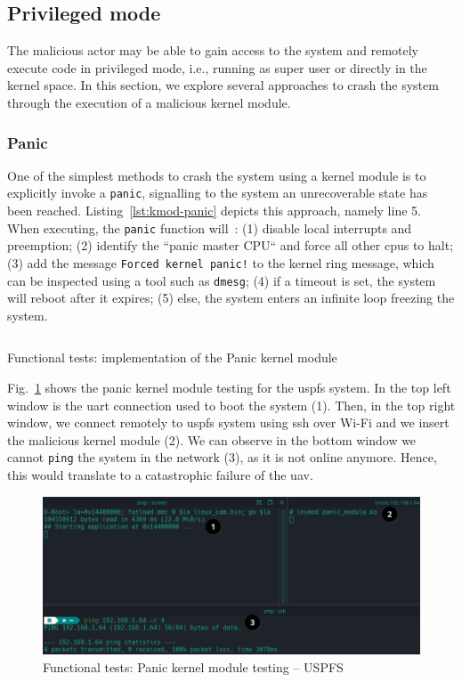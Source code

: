 \subsection{Privileged mode}
\label{sec:privileged-mode}
The malicious actor may be able to gain access to the system and remotely
execute code in privileged mode, i.e., running as super user or directly in the
kernel space. In this section, we explore several approaches to crash the system
through the execution of a malicious kernel module.

\subsubsection{Panic}
\label{sec:panic}
One of the simplest methods to crash the system using a kernel module is to
explicitly invoke a \lstinline{panic}, signalling to the system an unrecoverable
state has been reached. Listing~\ref{lst:kmod-panic} depicts this approach, namely
line 5. When executing, the \lstinline{panic} function will~\cite{panicLinux}: (1) disable local
interrupts and preemption; (2) identify the ``panic master CPU`` and force all
other \glspl{cpu} to halt; (3) add the message 
\lstinline{Forced kernel panic!} to the kernel ring message, which can be inspected using a tool
such as \lstinline{dmesg}; (4) if a timeout is set, the system will reboot after
it expires; (5)
else, the system enters an infinite loop freezing the system.

\begin{longlisting}
\centering
\inputminted[]{c}{./listing/kmod_panic.c}
\caption{Functional tests: implementation of the Panic kernel module}
\label{lst:kmod-panic}
\end{longlisting}

Fig.~\ref{fig:kmod-panic-test} shows the panic kernel module testing for the
\gls{uspfs} system. In the top
left window is the \gls{uart} connection used to boot the system (1). Then, in
the top right window, we
connect remotely to \gls{uspfs} system using \gls{ssh} over Wi-Fi and we insert
the malicious kernel module (2). We can observe in the bottom window we cannot
\lstinline{ping} the system in the network (3), as it is not online
anymore. Hence, this would translate to a catastrophic failure of the \gls{uav}.

\begin{figure}[!hbt]
  \centering
  \includegraphics[width=1.0\textwidth]{./img/png/kmod-panic-test-annot} 
  \caption{Functional tests: Panic kernel module testing -- USPFS}%
  \label{fig:kmod-panic-test}
\end{figure}

